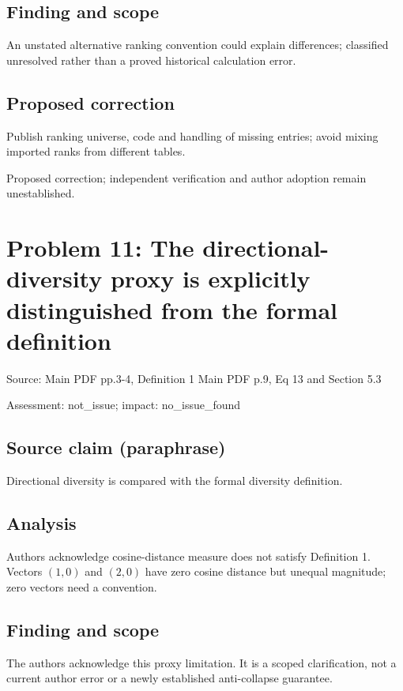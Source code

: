 \documentclass[11pt]{article}
\begin{document}
\subsection*{Finding and scope}

An unstated alternative ranking convention could explain differences; classified unresolved rather than a proved historical calculation error.

\subsection*{Proposed correction}

Publish ranking universe, code and handling of missing entries; avoid mixing imported ranks from different tables.

Proposed correction; independent verification and author adoption remain unestablished.

\section*{Problem 11: The directional-diversity proxy is explicitly distinguished from the formal definition}

Source: Main PDF pp.3-4, Definition 1 Main PDF p.9, Eq 13 and Section 5.3

Assessment: not\_issue; impact: no\_issue\_found

\subsection*{Source claim (paraphrase)}

Directional diversity is compared with the formal diversity definition.

\subsection*{Analysis}

Authors acknowledge cosine-distance measure does not satisfy Definition 1. Vectors \((1,0)\) and \((2,0)\) have zero cosine distance but unequal magnitude; zero vectors need a convention.

\subsection*{Finding and scope}

The authors acknowledge this proxy limitation. It is a scoped clarification, not a current author error or a newly established anti-collapse guarantee.
\end{document}
